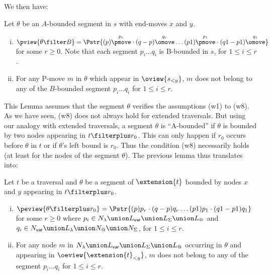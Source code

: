 We then have:
\begin{lemma}
Let $\theta$ be an $A$-bounded segment in $s$ with end-moves $x$ and
$y$.

\begin{enumerate}[(i)]
  \item $ \pview{\theta \filter B} = \Pstr{ (p){\stackrel{p_r}\pmove} \cdot (q-p){\stackrel{q_r}\omove} \ldots
                                     (p1){\stackrel{p_1}\pmove}
\cdot (q1-p1){\stackrel{q_1}\omove} }$ for some $r\geq 0$. Note
that each segment $p_i \ldots q_i$ is B-bounded in $s$, for
$1\leq i \leq r$.
  \item For any P-move $m$ in $\theta$ which appear in
$\oview{s_{<y}}$, $m$ does not belong to any of the $B$-bounded
segment $p_i \ldots q_i$ for $1\leq i \leq r$.
\end{enumerate}
\end{lemma}
This Lemma assumes that the segment $\theta$ verifies the
assumptions (w1) to (w8). As we have seen, (w8) does not always hold for extended traversals. But using our analogy with extended traversals, a  segment $\theta$ is ``A-bounded'' if $\theta$ is bounded by two nodes appearing in $t\filterplus r_0$. This can only happen if $r_0$ occurs before $\theta$ in $t$ or if $\theta$'s left bound is $r_0$.  Thus the condition (w8) necessarily holds (at least for the nodes of the segment $\theta$).
The previous lemma thus translates into:
\begin{lemma}
\label{lem:pview_bounded_segment} Let $t$ be a traversal and
$\theta$ be a segment of $\extension{t}$ bounded by nodes $x$ and $y$ appearing in $t\filterplus r_0$.
\begin{enumerate}[(i)]
  \item $ \peview{\theta \filterplus r_0} = \Pstr{ (p){p_r} \cdot (q-p){q_r} \ldots
(p1){p_1} \cdot (q1-p1){q_1} }$ for some $r\geq 0$ where
$p_i \in N_\lambda \union L_{\sf var} \union L_\Sigma \union
L_@$ and $q_i \in N_{\sf var} \union L_\lambda \union N_@
\union N_\Sigma$, for $1\leq i \leq r$.
  \item For any node $m$ in $N_\lambda \union L_{\sf var} \union L_\Sigma \union L_@$ occurring in $\theta$ and appearing in
$\oeview{\extension{t}_{<y}}$, $m$ does not belong to any of the
segment $p_i \ldots q_i$ for $1\leq i \leq r$.
\end{enumerate}
\end{lemma}
\smallskip

